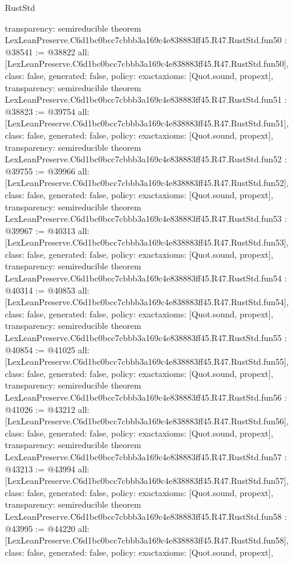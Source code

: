 \begin{lexlean}{RustStd}
\begin{coremodule}
{  transparency: semireducible
}
theorem LexLeanPreserve.C6d1bc0bcc7cbbb3a169c4e838883ff45.R47.RustStd.fun50 : @38541 := @38822 {
  all: [LexLeanPreserve.C6d1bc0bcc7cbbb3a169c4e838883ff45.R47.RustStd.fun50],
  class: false,
  generated: false,
  policy: exact{axioms: [Quot.sound, propext]},
  transparency: semireducible
}
theorem LexLeanPreserve.C6d1bc0bcc7cbbb3a169c4e838883ff45.R47.RustStd.fun51 : @38823 := @39754 {
  all: [LexLeanPreserve.C6d1bc0bcc7cbbb3a169c4e838883ff45.R47.RustStd.fun51],
  class: false,
  generated: false,
  policy: exact{axioms: [Quot.sound, propext]},
  transparency: semireducible
}
theorem LexLeanPreserve.C6d1bc0bcc7cbbb3a169c4e838883ff45.R47.RustStd.fun52 : @39755 := @39966 {
  all: [LexLeanPreserve.C6d1bc0bcc7cbbb3a169c4e838883ff45.R47.RustStd.fun52],
  class: false,
  generated: false,
  policy: exact{axioms: [Quot.sound, propext]},
  transparency: semireducible
}
theorem LexLeanPreserve.C6d1bc0bcc7cbbb3a169c4e838883ff45.R47.RustStd.fun53 : @39967 := @40313 {
  all: [LexLeanPreserve.C6d1bc0bcc7cbbb3a169c4e838883ff45.R47.RustStd.fun53],
  class: false,
  generated: false,
  policy: exact{axioms: [Quot.sound, propext]},
  transparency: semireducible
}
theorem LexLeanPreserve.C6d1bc0bcc7cbbb3a169c4e838883ff45.R47.RustStd.fun54 : @40314 := @40853 {
  all: [LexLeanPreserve.C6d1bc0bcc7cbbb3a169c4e838883ff45.R47.RustStd.fun54],
  class: false,
  generated: false,
  policy: exact{axioms: [Quot.sound, propext]},
  transparency: semireducible
}
theorem LexLeanPreserve.C6d1bc0bcc7cbbb3a169c4e838883ff45.R47.RustStd.fun55 : @40854 := @41025 {
  all: [LexLeanPreserve.C6d1bc0bcc7cbbb3a169c4e838883ff45.R47.RustStd.fun55],
  class: false,
  generated: false,
  policy: exact{axioms: [Quot.sound, propext]},
  transparency: semireducible
}
theorem LexLeanPreserve.C6d1bc0bcc7cbbb3a169c4e838883ff45.R47.RustStd.fun56 : @41026 := @43212 {
  all: [LexLeanPreserve.C6d1bc0bcc7cbbb3a169c4e838883ff45.R47.RustStd.fun56],
  class: false,
  generated: false,
  policy: exact{axioms: [Quot.sound, propext]},
  transparency: semireducible
}
theorem LexLeanPreserve.C6d1bc0bcc7cbbb3a169c4e838883ff45.R47.RustStd.fun57 : @43213 := @43994 {
  all: [LexLeanPreserve.C6d1bc0bcc7cbbb3a169c4e838883ff45.R47.RustStd.fun57],
  class: false,
  generated: false,
  policy: exact{axioms: [Quot.sound, propext]},
  transparency: semireducible
}
theorem LexLeanPreserve.C6d1bc0bcc7cbbb3a169c4e838883ff45.R47.RustStd.fun58 : @43995 := @44220 {
  all: [LexLeanPreserve.C6d1bc0bcc7cbbb3a169c4e838883ff45.R47.RustStd.fun58],
  class: false,
  generated: false,
  policy: exact{axioms: [Quot.sound, propext]},
}
\end{coremodule}
\end{lexlean}
